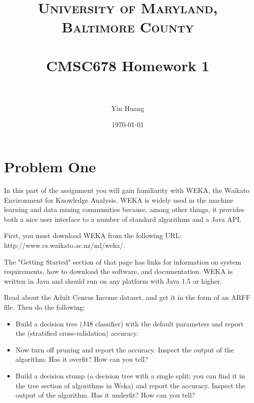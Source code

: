 \documentclass[paper=a4, fontsize=11pt]{scrartcl} %
\title{	
\normalfont \normalsize 
\textsc{University of Maryland, Baltimore County} \\ [25pt] %
\horrule{0.5pt} \\[0.4cm] %
\huge CMSC678 Homework 1  \\ %
\horrule{2pt} \\[0.5cm] %
}
\author{Yin Huang} %
\date{\normalsize\today} %
\numberwithin{equation}{section} %
\numberwithin{figure}{section} %
\numberwithin{table}{section} %
\begin{document}
\maketitle %


\section{Problem One}
In this part of the assignment you will gain familiarity with WEKA, the Waikato Environment for Knowledge Analysis. WEKA is widely used in the machine learning and data mining communities because, among other things, it provides both a nice user interface to a number of standard algorithms and a Java API.

First, you must download WEKA from the following URL: http://www.cs.waikato.ac.nz/ml/weka/. 

The "Getting Started" section of that page has links for information on system requirements, how to download the software, and documentation. WEKA is written in Java and should run on any platform with Java 1.5 or higher.

Read about the Adult Census Income dataset, and get it in the form of an ARFF file. Then do the following: 

\begin{itemize}
 \item  Build a decision tree (J48 classifier) with the default parameters and report the (stratified cross-validation) accuracy.
  \item  Now turn off pruning and report the accuracy. Inspect the output of the algorithm. Has it overfit? How can you tell?
  \item  Build a decision stump (a decision tree with a single split; you can find it in the tree section of algorithms in Weka) and report the accuracy. Inspect the output of the algorithm. Has it underfit? How can you tell?

\end{itemize}
\end{document}
